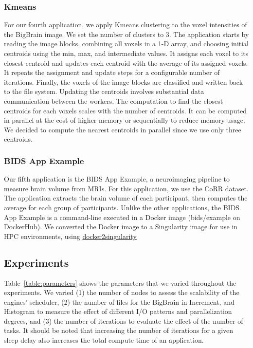 \documentclass[AMA,STIX1COL]{WileyNJD-v2}
\begin{document}
\subsubsection{Kmeans}
For our fourth application, we apply Kmeans clustering to the voxel
intensities of the BigBrain image. We set the number of clusters to 3. The
application starts by reading the image blocks, combining all voxels in a
1-D array, and choosing initial centroids using the min, max, and
intermediate values. It assigns each voxel to its closest centroid and
updates each centroid with the average of its assigned voxels. It repeats
the assignment and update steps for a configurable number of iterations.
Finally, the voxels of the image blocks are classified and written back to
the file system. Updating the centroids involves substantial data
communication between the workers.
The computation to find the closest centroids for each voxels scales with the number of centroids.
It can be computed in parallel at the cost of higher memory or sequentially to reduce memory usage.
We decided to compute the nearest centroids in parallel since we use only three centroids.
		
\subsubsection{BIDS App Example}
Our fifth application is the BIDS App Example, a neuroimaging pipeline to
measure brain volume from MRIs. For this application, we use the CoRR
dataset. The application extracts the brain volume of each participant,
then computes the average for each group of participants. Unlike the other
applications, the BIDS App Example is a command-line executed in a Docker image
(bids/example on DockerHub). We converted the Docker image to a Singularity
image for use in HPC environments, using
\href{https://hub.docker.com/r/singularityware/docker2singularity/tags/}{docker2singularity}
				
\subsection{Experiments}
Table~\ref{table:parameters} shows the parameters that we varied
throughout the experiments. We varied (1) the number of nodes to assess
the scalability of the engines' scheduler, (2) the number of files for the BigBrain
in Increment, and Histogram to measure the
effect of different I/O patterns and parallelization degrees, and (3) the
number of iterations to evaluate the effect of the number of tasks.
It should be noted that increasing the number of iterations for a given sleep 
delay also increases the total compute time of an application.
				
\end{document}
